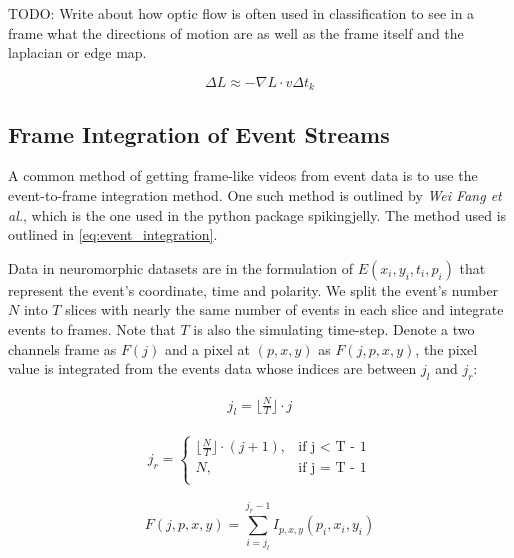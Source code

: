\color{red} TODO: Write about how optic flow is often used in classification to see in a frame what the directions of motion are as well as the frame itself and the laplacian or edge map. \color{black}

\begin{equation}
      \Delta L \approx -\nabla L \cdot v \Delta t_k
      \label{eq:optic_flow}
\end{equation}

\subsection{Frame Integration of Event Streams} \label{ssec:frame_integration}

A common method of getting frame-like videos from event data is to use the event-to-frame integration method. One such method is outlined by \textit{Wei Fang et al.}\cite{LearnableMembraneSNN}, which is the one used in the python package spikingjelly\cite{SpikingJelly}. The method used is outlined in \cref{eq:event_integration}.

Data in neuromorphic datasets are in the formulation of $ E(x_i, y_i, t_i, p_i) $ that represent the event's coordinate, time and polarity. We split the event's number $ N $ into $ T $ slices with nearly the same number of events in each slice and integrate events to frames. Note that $ T $ is also the simulating time-step. Denote a two channels frame as $ F(j) $ and a pixel at $ (p, x, y) $ as $ F(j, p, x, y) $, the pixel value is integrated from the events data whose indices are between $ j_l $ and $ j_r $:

\begin{align*}
      j_l = \lfloor \frac{N}{T} \rfloor \cdot j
\end{align*}
 
\begin{align*}
      j_r = \begin{cases}
            \lfloor \frac{N}{T} \rfloor \cdot (j + 1), & \text{if j < T - 1}\\
            N, & \text{if j = T - 1}\\
          \end{cases}
\end{align*}

\begin{equation}
      F(j, p, x, y) = \sum^{j_r -1}_{i=j_l}I_{p, x, y}(p_i, x_i, y_i)
      \label{eq:event_integration}
\end{equation}
 
